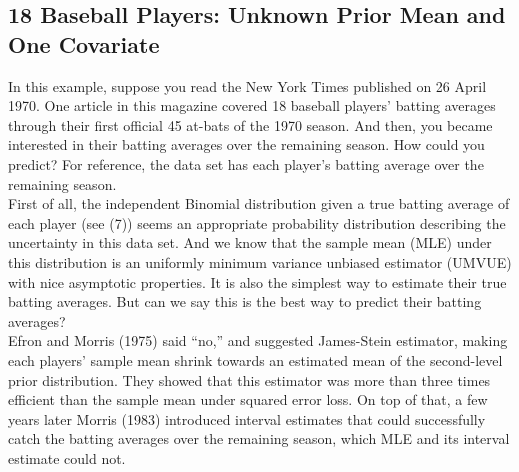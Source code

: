 \documentclass[article]{jss}
\begin{document}
\subsection[Unknown Second-level Mean and One Covariate]{18 Baseball Players: Unknown Prior Mean and One Covariate}
In this example, suppose you read the New York Times published on 26 April 1970. One article in this magazine covered 18 baseball players' batting averages through their first official 45 at-bats of the 1970 season. And then, you became interested in their batting averages over the remaining season. How could you predict? For reference, the data set   has each player's batting average over the remaining season. 
\\

First of all, the independent Binomial distribution given a true batting average of each player (see (7)) seems an appropriate probability distribution describing the uncertainty in this data set. And we know that the sample mean (MLE) under this distribution is an uniformly minimum variance unbiased estimator (UMVUE) with nice asymptotic properties. It is also the simplest way to estimate their true batting averages. But can we say this is the best way to predict their batting averages?
\\

Efron and Morris (1975) said ``no,'' and suggested James-Stein estimator, making each players' sample mean shrink towards an estimated mean of the second-level prior distribution. They showed that this estimator was more than three times efficient than the sample mean under squared error loss. On top of that, a few years later Morris (1983) introduced interval estimates that could successfully catch the batting averages over the remaining season, which MLE and its interval estimate could not.
\\
\end{document}
